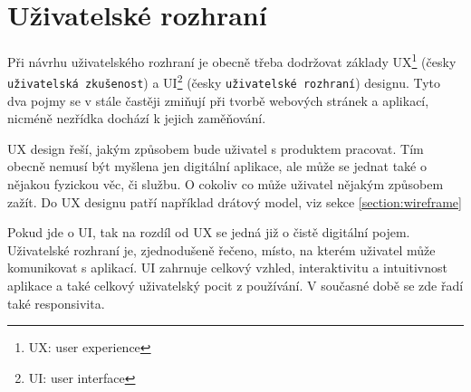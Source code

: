 \section{Uživatelské rozhraní}
Při návrhu uživatelského rozhraní je obecně třeba dodržovat základy UX\footnote{UX: user experience} (česky \texttt{uživatelská zkušenost}) a UI\footnote{UI: user interface} (česky \texttt{uživatelské rozhraní}) designu. Tyto dva pojmy se v stále častěji zmiňují při tvorbě webových stránek a aplikací, nicméně nezřídka dochází k jejich zaměňování. 
\par UX design řeší, jakým způsobem bude uživatel s produktem pracovat. Tím obecně nemusí být myšlena jen digitální aplikace, ale může se jednat také o nějakou fyzickou věc, či službu. O cokoliv co může uživatel nějakým způsobem zažít. Do UX designu patří například drátový model, viz sekce \ref{section:wireframe}
\par Pokud jde o UI, tak na rozdíl od UX se jedná již o čistě digitální pojem. Uživatelské rozhraní je, zjednodušeně řečeno, místo, na kterém uživatel může komunikovat s aplikací. UI zahrnuje celkový vzhled, interaktivitu a intuitivnost aplikace a také celkový uživatelský pocit z používání. V současné době se zde řadí také responsivita.

